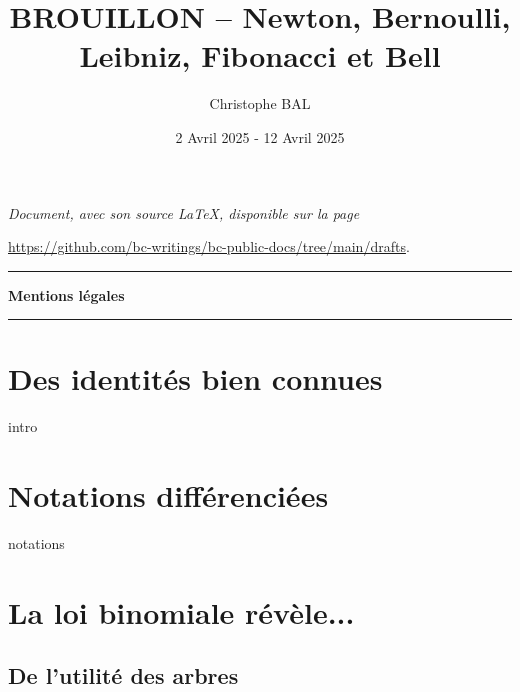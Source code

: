 \documentclass[12pt]{amsart}
\begin{document}
\title{BROUILLON -- Newton, Bernoulli, Leibniz, Fibonacci et Bell}
\author{Christophe BAL}
\date{2 Avril 2025 - 12 Avril 2025}

\maketitle

\begin{center}
	\itshape
	Document, avec son source \LaTeX, disponible sur la page

	\url{https://github.com/bc-writings/bc-public-docs/tree/main/drafts}.
\end{center}


\bigskip


\begin{center}
	\hrule\vspace{.3em}
	{
		\fontsize{1.35em}{1em}\selectfont
		\textbf{Mentions \og légales \fg}
	}

	\vspace{0.45em}
	\doclicenseThis
	\hrule
\end{center}


\bigskip


\setcounter{tocdepth}{2}
\tableofcontents




\newpage

\section{Des identités bien connues} \label{beautiful-id}

{intro}




\section{Notations différenciées}

{notations}




\section{La loi binomiale révèle...} \label{bino-implies}

    \subsection{De l'utilité des arbres} \label{useful-trees}
    
\end{document}
